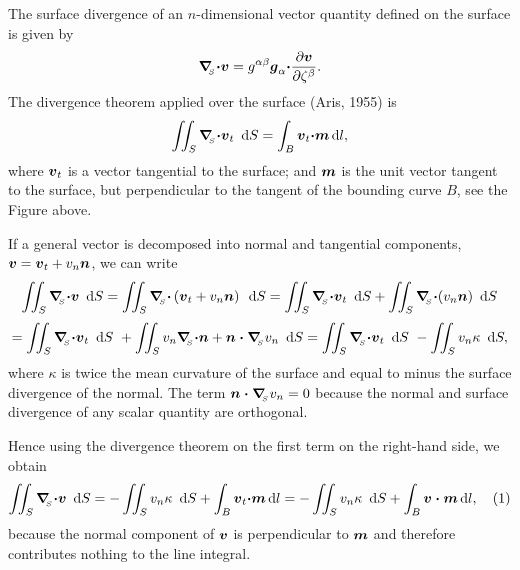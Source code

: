 The surface divergence of an $ n\!$-\/dimensional vector quantity defined on the surface is given by \[ \mbox{\boldmath$\nabla$}_{\!\!_S} \mbox{\boldmath$\cdot v$} = g^{\alpha\beta} \mbox{\boldmath$g$}_{\alpha} \mbox{\boldmath$\cdot$} \frac{\partial \mbox{\boldmath$v$}}{\partial \zeta^{\beta}}. \] The divergence theorem applied over the surface (Aris, 1955) is \[ \int\!\!\!\int_{S} \mbox{\boldmath$\nabla$}_{\!\!_S} \mbox{\boldmath$\cdot v$}_{t}\,\mbox{ d}S = \int_{B} \mbox{\boldmath$v$}_{t} \mbox{\boldmath$\cdot m$}\,\mbox{d} l, \] where $ \mbox{\boldmath$v$}_{t}$ is a vector tangential to the surface; and $ \mbox{\boldmath$m$}$ is the unit vector tangent to the surface, but perpendicular to the tangent of the bounding curve $ B$, see the Figure above.

If a general vector is decomposed into normal and tangential components, $ \mbox{\boldmath$v$} = \mbox{\boldmath$v$}_{t} + v_{n} \mbox{\boldmath$n$} $, we can write \[ \int\!\!\!\int_{S} \mbox{\boldmath$\nabla$}_{\!\!_S} \mbox{\boldmath$\cdot v$}\,\mbox{ d}S = \int\!\!\!\int_{S} \mbox{\boldmath$\nabla$}_{\!\!_S} \mbox{\boldmath$\cdot$} \left(\mbox{\boldmath$v$}_{t} + v_{n} \mbox{\boldmath$n$}\right)\,\mbox{ d}S = \int\!\!\!\int_{S} \mbox{\boldmath$\nabla$}_{\!\!_S} \mbox{\boldmath$\cdot v$}_{t}\,\mbox{ d}S + \int\!\!\!\int_{S} \mbox{\boldmath$\nabla$}_{\!\!_S} \mbox{\boldmath$\cdot$} (v_{n} \mbox{\boldmath$n$})\,\mbox{ d}S \] \[ = \int\!\!\!\int_{S} \mbox{\boldmath$\nabla$}_{\!\!_S} \mbox{\boldmath$\cdot v$}_{t}\,\mbox{ d}S\ + \int\!\!\!\int_{S} v_{n} \mbox{\boldmath$\nabla$}_{\!\!_S} \mbox{\boldmath$\cdot$} \mbox{\boldmath$n$} + \mbox{\boldmath$n\cdot\nabla$}_{\!\!_S} v_{n}\,\mbox{ d}S = \int\!\!\!\int_{S} \mbox{\boldmath$\nabla$}_{\!\!_S} \mbox{\boldmath$\cdot v$}_{t}\,\mbox{ d}S\ - \int\!\!\!\int_{S} v_{n} \kappa\,\mbox{ d}S, \] where $\kappa$ is twice the mean curvature of the surface and equal to minus the surface divergence of the normal. The term $ \mbox{\boldmath$n\cdot\nabla$}_{\!\!_S} v_{n} = 0 $ because the normal and surface divergence of any scalar quantity are orthogonal.

Hence using the divergence theorem on the first term on the right-\/hand side, we obtain \[ \int\!\!\!\int_{S} \mbox{\boldmath$\nabla$}_{\!\!_S} \mbox{\boldmath$\cdot v$}\,\mbox{ d}S = - \int\!\!\!\int_{S} v_{n} \kappa\,\mbox{ d}S + \int_{B} \mbox{\boldmath$v$}_{t} \mbox{\boldmath$\cdot m$}\,\mbox{d} l = - \int\!\!\!\int_{S} v_{n} \kappa\,\mbox{ d}S + \int_{B} \mbox{\boldmath$v\cdot m$}\,\mbox{d} l, \quad (1) \] because the normal component of $ \mbox{\boldmath$v$}$ is perpendicular to $ \mbox{\boldmath$m$}$ and therefore contributes nothing to the line integral.

